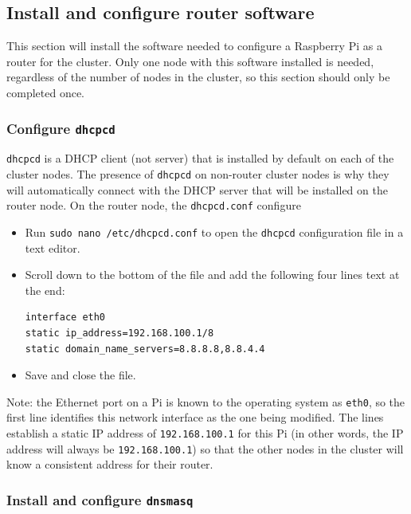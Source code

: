 \documentclass{article}
\begin{document}
\subsection{Install and configure router software}

This section will install the software needed to configure a Raspberry Pi as a router for the cluster. Only one node with this software installed is needed, regardless of the number of nodes in the cluster, so this section should only be completed once.

\subsubsection{Configure \texttt{dhcpcd}}

\texttt{dhcpcd} is a DHCP client (not server) that is installed by default on each of the cluster nodes. The presence of \texttt{dhcpcd} on non-router cluster nodes is why they will automatically connect with the DHCP server that will be installed on the router node. On the router node, the \texttt{dhcpcd.conf} configure

\begin{itemize}
    \item Run \texttt{sudo nano /etc/dhcpcd.conf} to open the \texttt{dhcpcd} configuration file in a text editor.
    
    \item Scroll down to the bottom of the file and add the following four lines text at the end:
\begin{verbatim}
interface eth0
static ip_address=192.168.100.1/8
static domain_name_servers=8.8.8.8,8.8.4.4
\end{verbatim}
    
    \item Save and close the file. 
\end{itemize}
    
    Note: the Ethernet port on a Pi is known to the operating system as \texttt{eth0}, so the first line identifies this network interface as the one being modified. The lines establish a static IP address of \texttt{192.168.100.1} for this Pi (in other words, the IP address will always be \texttt{192.168.100.1}) so that the other nodes in the cluster will know a consistent address for their router.

\subsubsection{Install and configure \texttt{dnsmasq}}
\end{document}
